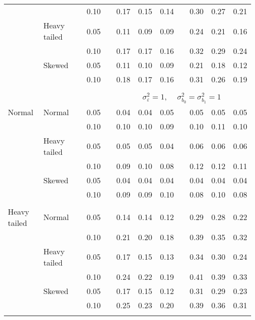 \begin{table}[ht]
\begin{scriptsize}
\begin{tabular}{ll p{.1cm} c p{.1cm} rrr p{.1cm} rrr}
             &              && 0.10 &&  0.17 & 0.15 & 0.14 && 0.30 & 0.27 & 0.21 \\ 
             & Heavy tailed && 0.05 &&  0.11 & 0.09 & 0.09 && 0.24 & 0.21 & 0.16 \\ 
             &              && 0.10 &&  0.17 & 0.17 & 0.16 && 0.32 & 0.29 & 0.24 \\ 
             & Skewed       && 0.05 &&  0.11 & 0.10 & 0.09 && 0.21 & 0.18 & 0.12 \\ 
             &              && 0.10 &&  0.18 & 0.17 & 0.16 && 0.31 & 0.26 & 0.19 \\ 

&&&&&&&&&&&\\
& && && \multicolumn{7}{c}{$\sigma_{\varepsilon}^2 = 1$, \ \ $\sigma_{b_0}^2 = \sigma_{b_1}^2 = 1$} \\ \cline{6-12}
\rowcolor{gray!20}Normal       & Normal       && 0.05 &&  0.04 & 0.04 & 0.05 && 0.05 & 0.05 & 0.05 \\ 
\rowcolor{gray!20}             &              && 0.10 &&  0.10 & 0.10 & 0.09 && 0.10 & 0.11 & 0.10 \\ 
\rowcolor{gray!20}             & Heavy tailed && 0.05 &&  0.05 & 0.05 & 0.04 && 0.06 & 0.06 & 0.06 \\ 
\rowcolor{gray!20}             &              && 0.10 &&  0.09 & 0.10 & 0.08 && 0.12 & 0.12 & 0.11 \\ 
\rowcolor{gray!20}             & Skewed       && 0.05 &&  0.04 & 0.04 & 0.04 && 0.04 & 0.04 & 0.04 \\ 
\rowcolor{gray!20}             &              && 0.10 &&  0.09 & 0.09 & 0.10 && 0.08 & 0.10 & 0.08 \\ 
             &&&&&&&&&&&\\
Heavy tailed & Normal       && 0.05 &&  0.14 & 0.14 & 0.12 && 0.29 & 0.28 & 0.22 \\ 
             &              && 0.10 &&  0.21 & 0.20 & 0.18 && 0.39 & 0.35 & 0.32 \\ 
             & Heavy tailed && 0.05 &&  0.17 & 0.15 & 0.13 && 0.34 & 0.30 & 0.24 \\ 
             &              && 0.10 &&  0.24 & 0.22 & 0.19 && 0.41 & 0.39 & 0.33 \\ 
             & Skewed       && 0.05 &&  0.17 & 0.15 & 0.12 && 0.31 & 0.29 & 0.23 \\ 
             &              && 0.10 &&  0.25 & 0.23 & 0.20 && 0.39 & 0.36 & 0.31 \\ 
             &&&&&&&&&&&\\

\end{tabular}
\end{scriptsize}
\end{table}
